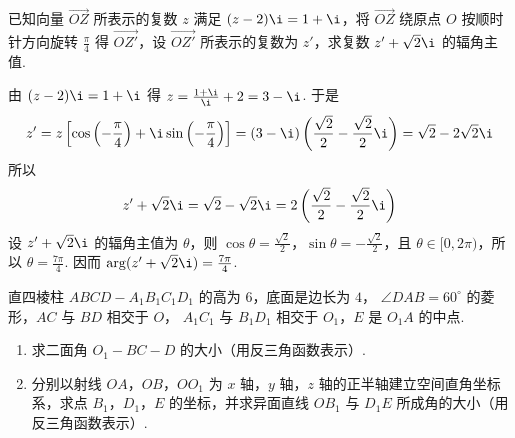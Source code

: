 \begin{problem}
已知向量 \(\overrightarrow{OZ}\) 所表示的复数 \(z\) 满足 \((z - 2)\i = 1 + \i\)，将 \(\overrightarrow{OZ}\) 绕原点 \(O\) 按顺时针方向旋转 \(\frac{\pi}{4}\) 得 \(\overrightarrow{OZ'}\)，设 \(\overrightarrow{OZ'}\) 所表示的复数为 \(z'\)，求复数 \(z' + \sqrt{2}\i\) 的辐角主值.
\end{problem}

\begin{solution}
由 \((z-2)\i=1+\i\) 得 \(z=\frac{1+\i}{\i}+2=3-\i\).
于是
\[
z'=z\left[\cos\left(-\frac{\pi}{4}\right)+\i\sin\left(-\frac{\pi}{4}\right)\right]
=(3-\i)\left(\frac{\sqrt{2}}{2}-\frac{\sqrt{2}}{2}\i\right)
=\sqrt{2}-2\sqrt{2}\i
\]
所以
\[
z'+\sqrt{2}\i=\sqrt{2}-\sqrt{2}\i
=2\left(\frac{\sqrt{2}}{2}-\frac{\sqrt{2}}{2}\i\right)
\]
设 \(z'+\sqrt{2}\i\) 的辐角主值为 \(\theta\)，则 \(\cos\theta=\frac{\sqrt{2}}{2}\)，\(\sin\theta=-\frac{\sqrt{2}}{2}\)，且 \(\theta\in[0,2\pi)\)，所以 \(\theta=\frac{7\pi}{4}\). 因而 \(\arg(z'+\sqrt{2}\i)=\frac{7\pi}{4}\).
\end{solution}

\begin{problem}
直四棱柱 \(ABCD - A_{1}B_{1}C_{1}D_{1} \) 的高为 \(6\)，底面是边长为 \(4\)， \(\angle DAB = 60^{\circ} \) 的菱形，\(AC\) 与 \(BD\) 相交于 \(O\)， \(A_{1}C_{1}\) 与 \(B_{1}D_{1}\) 相交于 \(O_{1}\)，\(E\) 是 \(O_{1}A\) 的中点.

\begin{enumerate}
\item 求二面角 \(O_{1}-BC-D \) 的大小（用反三角函数表示）.
\item 分别以射线 \(OA\)，\(OB\)，\(OO_{1}\) 为 \(x\) 轴，\(y\) 轴，\(z\) 轴的正半轴建立空间直角坐标系，求点 \(B_{1}\)，\(D_{1}\)，\(E\) 的坐标，并求异面直线 \(OB_{1}\) 与 \(D_{1}E\) 所成角的大小（用反三角函数表示）.
\end{enumerate}

\end{problem}

